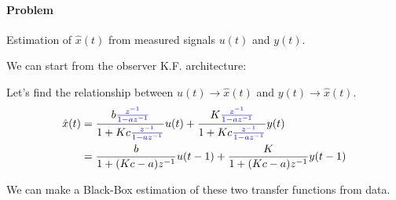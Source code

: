 \paragraph{Problem} Estimation of $\hat{x}(t)$ from measured signals $u(t)$ and $y(t)$.

We can start from the observer K.F. architecture:

Let's find the relationship between $u(t) \rightarrow \hat{x}(t)$ and $y(t) \rightarrow \hat{x}(t)$.
\begin{align*}
    \hat{x}(t) &= \frac{b {\color{blue}\frac{z^{-1}}{1-az^{-1}}}}{1+Kc{\color{blue}\frac{z^{-1}}{1-az^{-1}}}} u(t) + \frac{ K{\color{blue}\frac{z^{-1}}{1-az^{-1}}} }{1+Kc{\color{blue}\frac{z^{-1}}{1-az^{-1}}}} y(t) \\
    &= \frac{b}{1+(Kc-a)z^{-1}}u(t-1) + \frac{K}{1+(Kc-a)z^{-1}} y(t-1)
\end{align*}

We can make a Black-Box estimation of these two transfer functions from data.
